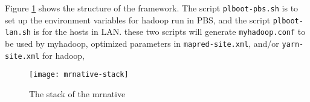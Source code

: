 Figure \ref{fig:mrnativestack} shows the structure of the framework.
The script \texttt{plboot-pbs.sh} is to set up the environment variables for hadoop run in PBS,
and the script \texttt{plboot-lan.sh} is for the hosts in LAN.
these two scripts will generate \texttt{myhadoop.conf} to be used by myhadoop,
optimized parameters in \texttt{mapred-site.xml}, and/or \texttt{yarn-site.xml} for hadoop,

\begin{figure}\centering
  \texttt{[image: mrnative-stack]}
  \caption{The stack of the mrnative}\label{fig:mrnativestack}
\end{figure}



